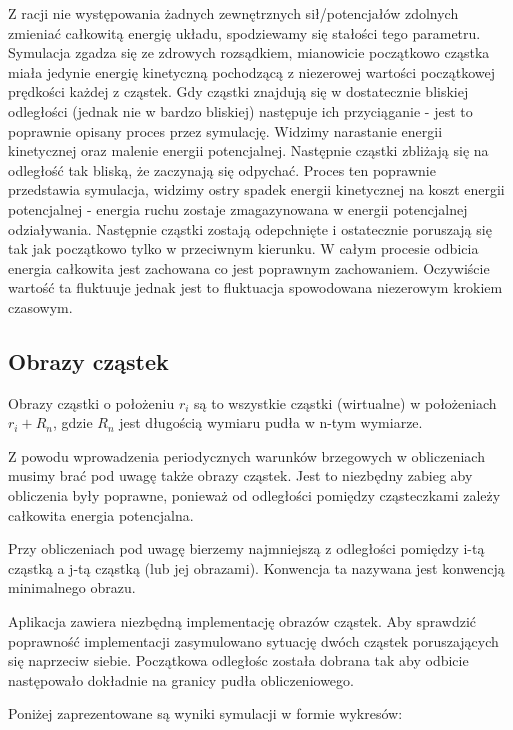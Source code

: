 \documentclass[a4paper,10pt]{article}
\begin{document}
Z racji nie występowania żadnych zewnętrznych sił/potencjałów zdolnych zmieniać całkowitą energię układu, spodziewamy się stałości tego parametru. Symulacja zgadza się ze zdrowych rozsądkiem, mianowicie początkowo cząstka miała jedynie energię kinetyczną pochodzącą z niezerowej wartości początkowej prędkości każdej z cząstek. Gdy cząstki znajdują się w dostatecznie bliskiej odległości (jednak nie w bardzo bliskiej) następuje ich przyciąganie - jest to poprawnie opisany proces przez symulację. Widzimy narastanie energii kinetycznej oraz malenie energii potencjalnej. Następnie cząstki zbliżają się na odległość tak bliską, że zaczynają się odpychać. Proces ten poprawnie przedstawia symulacja, widzimy ostry spadek energii kinetycznej na koszt energii potencjalnej - energia ruchu zostaje zmagazynowana w energii potencjalnej odziaływania. Następnie cząstki zostają odepchnięte i ostatecznie poruszają się tak jak początkowo tylko w przeciwnym kierunku. W całym procesie odbicia energia całkowita jest zachowana co jest poprawnym zachowaniem. Oczywiście wartość ta fluktuuje jednak jest to fluktuacja spowodowana niezerowym krokiem czasowym.

\subsection{Obrazy cząstek}

Obrazy cząstki o położeniu $r_i$ są to wszystkie cząstki (wirtualne) w położeniach $r_i + R_n$, gdzie $R_n$ jest długością wymiaru pudła w n-tym wymiarze.

Z powodu wprowadzenia periodycznych warunków brzegowych w obliczeniach musimy brać pod uwagę także obrazy cząstek. Jest to niezbędny zabieg aby obliczenia były poprawne, ponieważ od odległości pomiędzy cząsteczkami zależy całkowita energia potencjalna.

Przy obliczeniach pod uwagę bierzemy najmniejszą z odległości pomiędzy i-tą cząstką a j-tą cząstką (lub jej obrazami). Konwencja ta nazywana jest konwencją minimalnego obrazu.

Aplikacja zawiera niezbędną implementację obrazów cząstek. Aby sprawdzić poprawność implementacji zasymulowano sytuację dwóch cząstek poruszających się naprzeciw siebie. Początkowa odległośc została dobrana tak aby odbicie następowało dokładnie na granicy pudła obliczeniowego.

Poniżej zaprezentowane są wyniki symulacji w formie wykresów:
\end{document}
